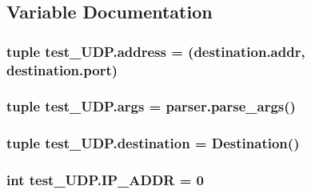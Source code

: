 \subsection{Variable Documentation}
\hypertarget{namespacetest__UDP_ac79f6ba2278e57b7a02d57bc3e9fdf02}{}
\subsubsection[{address}]{\setlength{\rightskip}{0pt plus 5cm}tuple test\+\_\+\+U\+D\+P.\+address = (destination.\+addr, destination.\+port)}\label{namespacetest__UDP_ac79f6ba2278e57b7a02d57bc3e9fdf02}
\hypertarget{namespacetest__UDP_aece376f1baf3191e9fadff2862fc6146}{}
\subsubsection[{args}]{\setlength{\rightskip}{0pt plus 5cm}tuple test\+\_\+\+U\+D\+P.\+args = parser.\+parse\+\_\+args()}\label{namespacetest__UDP_aece376f1baf3191e9fadff2862fc6146}
\hypertarget{namespacetest__UDP_a3c2d6964266d3f08f1d35ced19d07e69}{}
\subsubsection[{destination}]{\setlength{\rightskip}{0pt plus 5cm}tuple test\+\_\+\+U\+D\+P.\+destination = {\bf Destination}()}\label{namespacetest__UDP_a3c2d6964266d3f08f1d35ced19d07e69}
\hypertarget{namespacetest__UDP_a926edbf6ea365e960fd6e9bba4e5284d}{}
\subsubsection[{I\+P\+\_\+\+A\+D\+D\+R}]{\setlength{\rightskip}{0pt plus 5cm}int test\+\_\+\+U\+D\+P.\+I\+P\+\_\+\+A\+D\+D\+R = 0}\label{namespacetest__UDP_a926edbf6ea365e960fd6e9bba4e5284d}
\hypertarget{namespacetest__UDP_a5d7f02fdec28b4a2af6d80dde2c76ca2}{}
